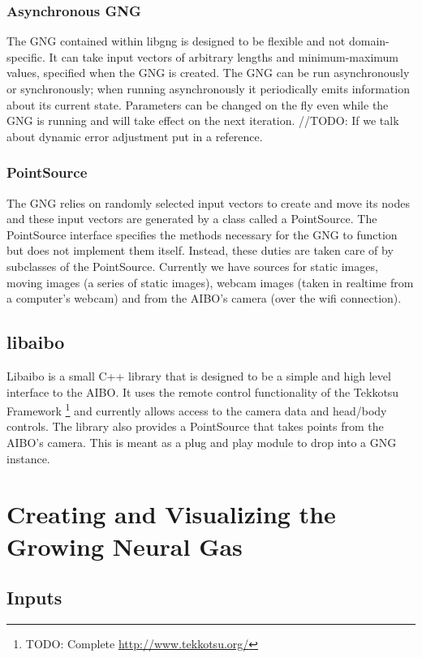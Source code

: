 \documentclass{article}
\renewcommand{\|}{\origbar} %
\begin{document}
\subsubsection{Asynchronous GNG}

The GNG contained within libgng is designed to be flexible and not domain-specific. It can take input vectors of arbitrary lengths and minimum-maximum values, specified when the GNG is created. The GNG can be run asynchronously or synchronously; when running asynchronously it periodically emits information about its current state. Parameters can be changed on the fly even while the GNG is running and will take effect on the next iteration. //TODO: If we talk about dynamic error adjustment put in a reference.

\subsubsection{PointSource}

The GNG relies on randomly selected input vectors to create and move its nodes and these input vectors are generated by a class called a PointSource. The PointSource interface specifies the methods necessary for the GNG to function but does not implement them itself. Instead, these duties are taken care of by subclasses of the PointSource. Currently we have sources for static images, moving images (a series of static images), webcam images (taken in realtime from a computer's webcam) and from the AIBO's camera (over the wifi connection).

\subsection{libaibo}

Libaibo is a small C++ library that is designed to be a simple and high level interface to the AIBO. It uses the remote control functionality of the Tekkotsu Framework \footnote{TODO: Complete \url{http://www.tekkotsu.org/}} and currently allows access to the camera data and head/body controls. The library also provides a PointSource that takes points from the AIBO's camera. This is meant as a plug and play module to drop into a GNG instance. 

\section{Creating and Visualizing the Growing Neural Gas}

\subsection{Inputs}
\end{document}
